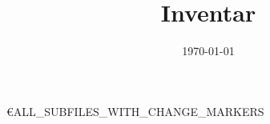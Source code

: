 \documentclass{article}
\title{Inventar}
\author{${AUTHOR}}
\date{\today}
\begin{document}
\maketitle

\tableofcontents

\pagebreak

€{ALL_SUBFILES_WITH_CHANGE_MARKERS}
\end{document}
